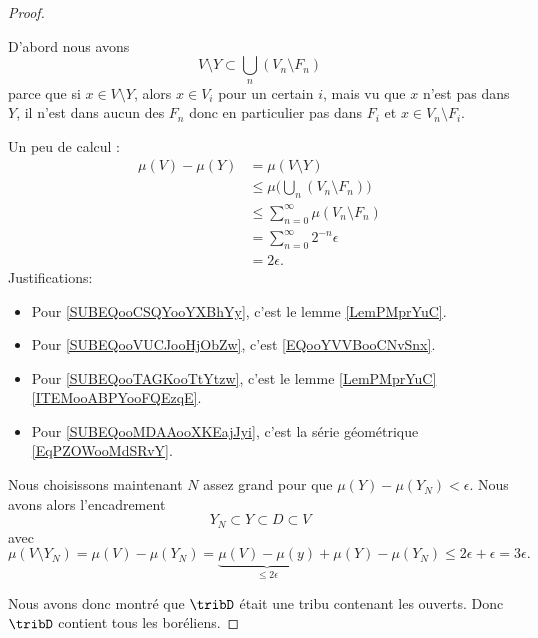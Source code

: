 \begin{proof}
\begin{subproof}
\begin{subproof}
			D'abord nous avons
			\begin{equation}        \label{EQooYVVBooCNvSnx}
				V\setminus Y\subset \bigcup_n(V_n\setminus F_n)
			\end{equation}
			parce que si \( x\in V\setminus Y\), alors \( x\in V_i\) pour un certain \( i\), mais vu que \( x\) n'est pas dans \( Y\), il n'est dans aucun des \( F_n\) donc en particulier pas dans \( F_i\) et \( x\in V_n\setminus F_i\).

			Un peu de calcul :
			\begin{subequations}
				\begin{align}
					\mu(V)-\mu(Y) & = \mu(V\setminus Y)   \label{SUBEQooCSQYooYXBhYy}                              \\
					              & \leq\mu\big( \bigcup_n(V_n\setminus F_n) \big)     \label{SUBEQooVUCJooHjObZw} \\
					              & \leq \sum_{n=0}^{\infty}\mu(V_n\setminus F_n)      \label{SUBEQooTAGKooTtYtzw} \\
					              & =\sum_{n=0}^{\infty}2^{-n}\epsilon                                             \\
					              & =2\epsilon.        \label{SUBEQooMDAAooXKEajJyi}
				\end{align}
			\end{subequations}
			Justifications:
			\begin{itemize}
				\item Pour \eqref{SUBEQooCSQYooYXBhYy}, c'est le lemme \ref{LemPMprYuC}.
				\item Pour \eqref{SUBEQooVUCJooHjObZw}, c'est \eqref{EQooYVVBooCNvSnx}.
				\item Pour \eqref{SUBEQooTAGKooTtYtzw}, c'est le lemme \ref{LemPMprYuC}\ref{ITEMooABPYooFQEzqE}.
				\item Pour \eqref{SUBEQooMDAAooXKEajJyi}, c'est la série géométrique \eqref{EqPZOWooMdSRvY}.
			\end{itemize}

			Nous choisissons maintenant \( N\) assez grand pour que \( \mu(Y)-\mu(Y_N)<\epsilon\). Nous avons alors l'encadrement
			\begin{equation}
				Y_N\subset Y\subset D\subset V
			\end{equation}
			avec
			\begin{equation}
				\mu(V\setminus Y_N)=\mu(V)-\mu(Y_N)=\underbrace{\mu(V)-\mu(y)}_{\leq 2\epsilon}+\mu(Y)-\mu(Y_N)\leq 2\epsilon+\epsilon=3\epsilon.
			\end{equation}
		\end{subproof}
	\end{subproof}
	Nous avons donc montré que \( \tribD\) était une tribu contenant les ouverts. Donc \( \tribD\) contient tous les boréliens.
\end{proof}

